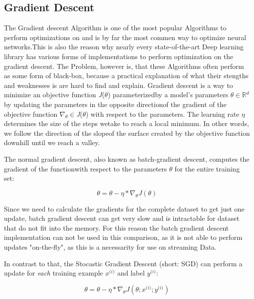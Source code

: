 \documentclass[12pt,oneside,a4paper,parskip]{scrbook}
\newcommand{\R}{\mathbb{R}}
\begin{document}
\pagebreak

\subsection{Gradient Descent}
The Gradient descent Algorithm is one of the most popular Algorithms to perform optimizations on and is by far the most 
commen way to optimize neural networks.This is also the reason why nearly every state-of-the-art Deep learning library 
has various forms of implementations to perform optimization on the gradient descent. The Problem, however is, that these
Algorithms often perform as some form of black-box, because a practical explanation of what their stengths and weaknesses 
is are hard to find and explain.
Gradient descent is a way to minimize an objective function \textit{J}($\theta$) parameterizedby a model's parameters $\theta \in \R{}^d$ by 
updating the parameters in the opposite directionof the gradient of the objective function $\nabla_\theta \in $\textit{J}($\theta$) with respect to 
the parameters. The learning rate $\eta$ determines the size of the steps wetake to reach a local minimum. In other words, 
we follow the direction of the slopeof the surface created by the objective function downhill until we reach a valley. \cite{overvieDiffRSLVQ}

The normal gradient descent, also known as batch-gradient descent, computes the gradient of the functionwith 
respect to the parameters $\theta$ for the entire training set:

\begin{equation}
\theta = \theta - \eta * \nabla_\theta \textit{J}(\theta)
\end{equation}

Since we need to calculate the gradients for the complete dataset to get just one update, batch gradient descent can get very
slow and is intractable for dataset that do not fit into the memory. For this reason the batch gradient descent implementation can not be used in this comparison,
as it is not able to perform updates "on-the-fly", as this is a necessarity for use on streaming Data. 

In contrast to that, the Stocastic Gradient Descent (short: SGD) can perform a update for \textit{each} training example
$\textit{x}^\textit{(i)}$ and label $\textit{y}^\textit{(i)}$:

\begin{equation}
\theta = \theta - \eta * \nabla_\theta \textit{J}(\theta;\textit{x}^\textit{(i)};\textit{y}^\textit{(i)})
\end{equation}
\end{document}
